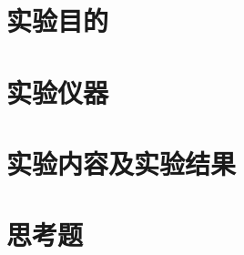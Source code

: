 \documentclass[UTF8]{article}
\begin{document}
\section{实验目的}



\section{实验仪器}

\section{实验内容及实验结果}

\section{思考题}

\end{document}
